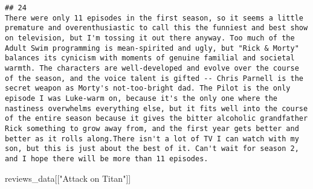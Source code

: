 \documentclass[
]{article}
\newenvironment{Shaded}{\begin{snugshade}}{\end{snugshade}}
\newcommand{\NormalTok}[1]{#1}
\newcommand{\StringTok}[1]{\textcolor[rgb]{0.31,0.60,0.02}{#1}}
\begin{document}
\begin{verbatim}
## 24                                                                                                                                                                                                                                                                                                                                                                                                                                                                                                                                                                                                                                                                                                                                                                                                                                                                                                                                                                                                                                                                                                                                                                                                                                                                                                                                                                                                There were only 11 episodes in the first season, so it seems a little premature and overenthusiastic to call this the funniest and best show on television, but I'm tossing it out there anyway. Too much of the Adult Swim programming is mean-spirited and ugly, but "Rick & Morty" balances its cynicism with moments of genuine familial and societal warmth. The characters are well-developed and evolve over the course of the season, and the voice talent is gifted -- Chris Parnell is the secret weapon as Morty's not-too-bright dad. The Pilot is the only episode I was Luke-warm on, because it's the only one where the nastiness overwhelms everything else, but it fits well into the course of the entire season because it gives the bitter alcoholic grandfather Rick something to grow away from, and the first year gets better and better as it rolls along.There isn't a lot of TV I can watch with my son, but this is just about the best of it. Can't wait for season 2, and I hope there will be more than 11 episodes.
\end{verbatim}

\begin{Shaded}
\begin{Highlighting}[]
\NormalTok{reviews\_data[[}\StringTok{"Attack on Titan"}\NormalTok{]]}
\end{Highlighting}
\end{Shaded}
\end{document}
